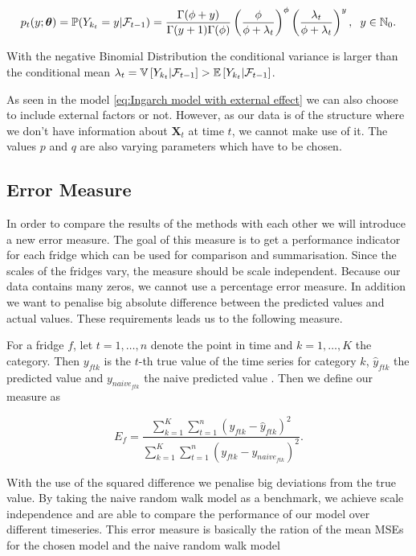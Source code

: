 \begin{equation*}
p_t(y;\bm{\theta})=\mathbb{P}(Y_{k_t}=y | \mathcal{F}_{t-1}) = \frac{\Gamma(\phi+y)}{\Gamma(y+1)\Gamma(\phi)}\left(\frac{\phi}{\phi+\lambda_t}\right)^\phi\left(\frac{\lambda_t}{\phi+\lambda_t}\right)^y, \hspace{0.2cm} y \in \mathbb{N}_0.
\label{eq:Ingarch negbinom Distribution}
\end{equation*}

With the negative Binomial Distribution the conditional variance is larger than the conditional mean $\lambda_t = \mathbb{V}\left[Y_{k_t} | \mathcal{F}_{t-1}\right] > \mathbb{E}\left[Y_{k_t} | \mathcal{F}_{t-1}\right]$.

As seen in the model \ref{eq:Ingarch model with external effect} we can also choose to include external factors or not. However, as our data is of the structure where we don't have information about $\bm{X}_t$ at time $t$, we cannot make use of it. The values $p$ and $q$ are also varying parameters which have to be chosen. 


\subsection{Error Measure}
\label{sec: Error Measure}

In order to compare the results of the methods with each other we will introduce a new error measure. The goal of this measure is to get a performance indicator for each fridge which can be used for comparison and summarisation. Since the scales of the fridges vary, the measure should be scale independent. Because our data contains many zeros, we cannot use a percentage error measure. In addition we want to penalise big absolute difference between the predicted values and actual values. These requirements leads us to the following measure.

For a fridge $f$, let $t = 1,\ldots,n$ denote the point in time and $k=1,\ldots,K$ the category. Then $y_{ftk}$ is the $t$-th true value of the time series for category $k$, $\hat{y}_{ftk}$ the predicted value and $y_{naive_{ftk}}$ the naive predicted value . Then we define our measure as

\begin{equation}
E_f=\frac{\sum_{k=1}^{K}\sum_{t=1}^n(y_{ftk}-\hat{y}_{ftk})^2}{\sum_{k=1}^{K}\sum_{t=1}^n(y_{ftk}-y_{naive_{ftk}})^2}.
\label{eq: Error Measure}
\end{equation}

With the use of the squared difference we penalise big deviations from the true value. By taking the naive random walk model as a benchmark, we achieve scale independence and are able to compare the performance of our model over different timeseries. This error measure is basically the ration of the mean MSEs for the chosen model and the naive random walk model

